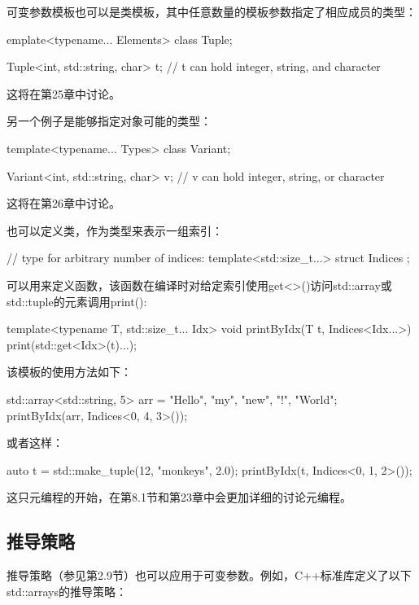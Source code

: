 可变参数模板也可以是类模板，其中任意数量的模板参数指定了相应成员的类型：

\begin{cpp}
emplate<typename... Elements>
class Tuple;

Tuple<int, std::string, char> t; // t can hold integer, string, and character
\end{cpp}

这将在第25章中讨论。

另一个例子是能够指定对象可能的类型：

\begin{cpp}
template<typename... Types>
class Variant;

Variant<int, std::string, char> v; // v can hold integer, string, or character
\end{cpp}

这将在第26章中讨论。

也可以定义类，作为类型来表示一组索引：

\begin{cpp}
// type for arbitrary number of indices:
template<std::size_t...>
struct Indices {};
\end{cpp}

可以用来定义函数，该函数在编译时对给定索引使用get<>()访问std::array或std::tuple的元素调用print():

\begin{cpp}
template<typename T, std::size_t... Idx>
void printByIdx(T t, Indices<Idx...>) {
	print(std::get<Idx>(t)...);
}
\end{cpp}

该模板的使用方法如下：

\begin{cpp}
std::array<std::string, 5> arr = {"Hello", "my", "new", "!", "World"};
printByIdx(arr, Indices<0, 4, 3>());
\end{cpp}

或者这样：

\begin{cpp}
auto t = std::make_tuple(12, "monkeys", 2.0);
printByIdx(t, Indices<0, 1, 2>());
\end{cpp}

这只元编程的开始，在第8.1节和第23章中会更加详细的讨论元编程。

\subsection{推导策略}

推导策略（参见第2.9节）也可以应用于可变参数。例如，C++标准库定义了以下std::arrays的推导策略：

